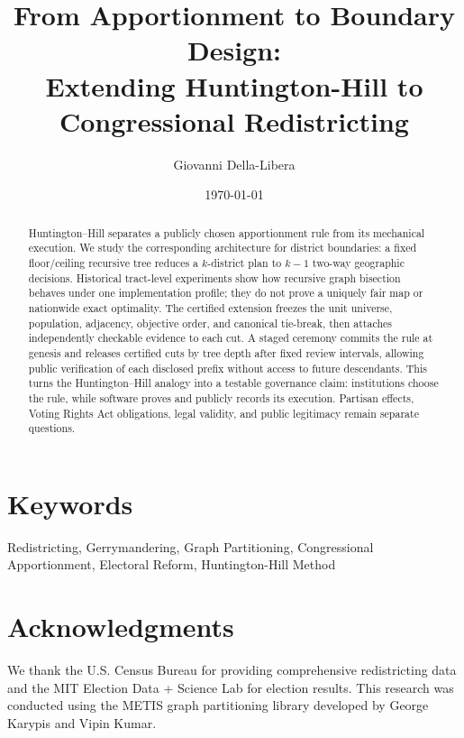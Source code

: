 \documentclass[12pt]{article}
\title{\textbf{From Apportionment to Boundary Design:\\
Extending Huntington-Hill to Congressional Redistricting}}
\author{
Giovanni Della-Libera
}
\date{\today}
\begin{document}
\maketitle

\begin{abstract}
Huntington--Hill separates a publicly chosen apportionment rule from its
mechanical execution. We study the corresponding architecture for district
boundaries: a fixed floor/ceiling recursive tree reduces a $k$-district plan to
$k-1$ two-way geographic decisions. Historical tract-level experiments show
how recursive graph bisection behaves under one implementation profile; they do
not prove a uniquely fair map or nationwide exact optimality. The certified
extension freezes the unit universe, population, adjacency, objective order,
and canonical tie-break, then attaches independently checkable evidence to
each cut. A staged ceremony commits the rule at genesis and releases certified
cuts by tree depth after fixed review intervals, allowing public verification
of each disclosed prefix without access to future descendants. This turns the
Huntington--Hill analogy into a testable governance claim: institutions choose
the rule, while software proves and publicly records its execution. Partisan
effects, Voting Rights Act obligations, legal validity, and public legitimacy
remain separate questions.
\end{abstract}

\section*{Keywords}
Redistricting, Gerrymandering, Graph Partitioning, Congressional Apportionment, Electoral Reform, Huntington-Hill Method










\section*{Acknowledgments}
We thank the U.S. Census Bureau for providing comprehensive redistricting data and the MIT Election Data + Science Lab for election results. This research was conducted using the METIS graph partitioning library developed by George Karypis and Vipin Kumar.



\end{document}
